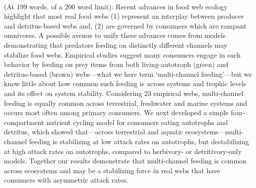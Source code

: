 \documentclass[12pt,a4paper,oneside]{article}
\begin{document}
 

\pagebreak
\linenumbers
\modulolinenumbers[2]

\\
\noindent (At 199 words, of a 200 word limit): Recent advances in food web ecology highlight that most real food webs (1) represent an interplay between producer and detritus-based webs and, (2) are governed by consumers which are rampant omnivores. A possible avenue to unify these advances comes from models demonstrating that predators feeding on distinctly
different channels may stabilize food webs. Empirical studies suggest many consumers engage in such behavior by feeding on prey items from both living-autotroph (green) and
detritus-based (brown) webs---what we here term `multi-channel feeding'---but we know little about how common such feeding is across systems and trophic levels and its effect on system stability. Considering 23 empirical webs, multi-channel feeding
is equally common across terrestrial, freshwater and marine systems and occurs most often
among primary consumers.  We next
developed a simple four-compartment nutrient cycling model for consumers
eating autotrophs and detritus, which showed that---across terrestrial and aquatic ecosystems---multi-channel feeding is
stabilizing at low attack rates on autotrophs, but destabilizing at high attack rates on autotrophs, compared to herbivory- or detritivory-only models. Together our results demonstrate that multi-channel feeding is common across ecosystems and may be a
stabilizing force in real webs that have consumers with asymmetric attack rates.

\end{document}
